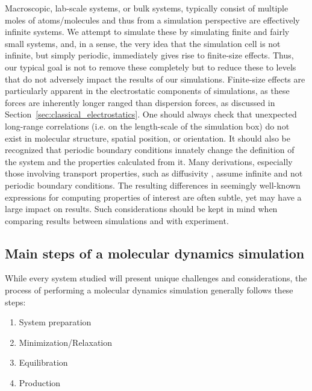 \documentclass[9pt,bestpractices]{livecoms}
\begin{document}
Macroscopic, lab-scale systems, or bulk systems, typically consist of multiple moles of atoms/molecules and thus from a simulation perspective are effectively infinite systems.
We attempt to simulate these by simulating finite and fairly small systems, and, in a sense, the very idea that the simulation cell is not infinite, but simply periodic, immediately gives rise to finite-size effects.
Thus, our typical goal is not to remove these completely but to reduce these to levels that do not adversely impact the results of our simulations.
Finite-size effects are particularly apparent in the electrostatic components of simulations, as these forces are inherently longer ranged than dispersion forces, as discussed in Section~\ref{sec:classical_electrostatics}.
One should always check that unexpected long-range correlations (i.e. on the length-scale of the simulation box) do not exist in molecular structure, spatial position, or orientation.
It should also be recognized that periodic boundary conditions innately change the definition of the system and the properties calculated from it.
Many derivations, especially those involving transport properties, such as diffusivity \citep{Yeh2004}, assume infinite and not periodic boundary conditions.
The resulting differences in seemingly well-known expressions for computing properties of interest are often subtle, yet may have a large impact on results.
Such considerations should be kept in mind when comparing results between simulations and with experiment.

\subsection{Main steps of a molecular dynamics simulation}
\label{sec:main_steps}
While every system studied will present unique challenges and considerations,
the process of performing a molecular dynamics simulation generally follows
these steps:

\begin{enumerate}
\item System preparation
\item Minimization/Relaxation
\item Equilibration
\item Production
\end{enumerate}
\end{document}
